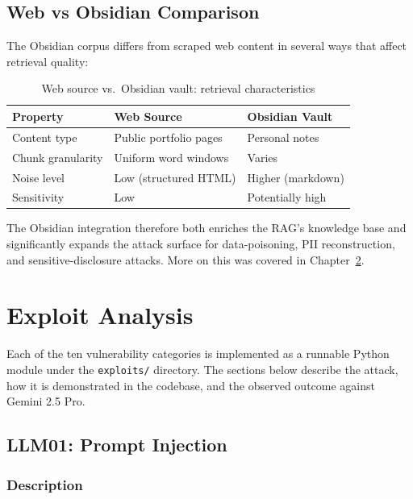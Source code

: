 \documentclass[12pt, a4paper]{report}
\begin{document}
\section{Web vs Obsidian Comparison}

The Obsidian corpus differs from scraped web content in several ways that affect retrieval quality:
\medskip
\begin{table}[H]
      \centering
      \begin{tabularx}{\linewidth}{lXX}
            \toprule
            \textbf{Property} & \textbf{Web Source}    & \textbf{Obsidian Vault} \\
            \midrule
            Content type      & Public portfolio pages & Personal notes          \\
            Chunk granularity & Uniform word windows   & Varies                  \\
            Noise level       & Low (structured HTML)  & Higher (markdown)       \\
            Sensitivity       & Low                    & Potentially high        \\
            \bottomrule
      \end{tabularx}
      \caption{Web source vs.\ Obsidian vault: retrieval characteristics}
\end{table}

The Obsidian integration therefore both enriches the RAG's knowledge base and significantly
expands the attack surface for data-poisoning, PII reconstruction, and sensitive-disclosure
attacks. More on this was covered in Chapter~\ref{chap:exploits}.

\chapter{Exploit Analysis}
\label{chap:exploits}

Each of the ten vulnerability categories is implemented as a runnable Python module under the
\texttt{exploits/} directory. The sections below describe the attack, how it is demonstrated
in the codebase, and the observed outcome against Gemini 2.5 Pro.

\section{LLM01: Prompt Injection}

\subsection{Description}
\end{document}
